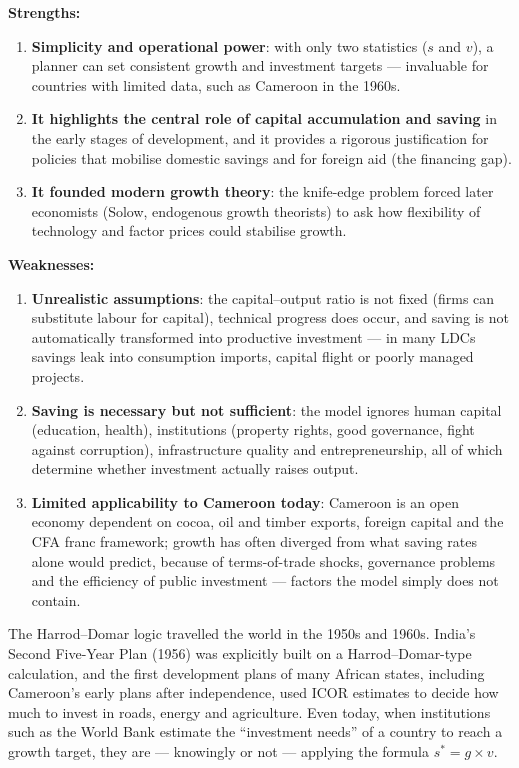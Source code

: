 \documentclass[11pt]{article}
\newcounter{popsec}
\newcounter{popsub}
\newcommand{\courssub}[1]{%
  \stepcounter{popsub}%
  \par\vspace{9pt}\noindent{\popxbold\fontsize{11.5}{13}\selectfont\color{popink}{\color{poporange}\thepopsec.\thepopsub}\hspace{6pt}#1}\par\nopagebreak\vspace{4pt}
}
\begin{document}
\courssub{Critical Evaluation of the Harrod--Domar Model}

\begin{propriete}
\textbf{Strengths:}
\begin{enumerate}
\item \textbf{Simplicity and operational power}: with only two statistics ($s$ and $v$), a planner can set consistent growth and investment targets — invaluable for countries with limited data, such as Cameroon in the 1960s.
\item \textbf{It highlights the central role of capital accumulation and saving} in the early stages of development, and it provides a rigorous justification for policies that mobilise domestic savings and for foreign aid (the financing gap).
\item \textbf{It founded modern growth theory}: the knife-edge problem forced later economists (Solow, endogenous growth theorists) to ask how flexibility of technology and factor prices could stabilise growth.
\end{enumerate}
\textbf{Weaknesses:}
\begin{enumerate}
\item \textbf{Unrealistic assumptions}: the capital--output ratio is not fixed (firms can substitute labour for capital), technical progress does occur, and saving is not automatically transformed into productive investment — in many LDCs savings leak into consumption imports, capital flight or poorly managed projects.
\item \textbf{Saving is necessary but not sufficient}: the model ignores human capital (education, health), institutions (property rights, good governance, fight against corruption), infrastructure quality and entrepreneurship, all of which determine whether investment actually raises output.
\item \textbf{Limited applicability to Cameroon today}: Cameroon is an open economy dependent on cocoa, oil and timber exports, foreign capital and the CFA franc framework; growth has often diverged from what saving rates alone would predict, because of terms-of-trade shocks, governance problems and the efficiency of public investment — factors the model simply does not contain.
\end{enumerate}
\end{propriete}

\begin{savaistu}
The Harrod--Domar logic travelled the world in the 1950s and 1960s. India's Second Five-Year Plan (1956) was explicitly built on a Harrod--Domar-type calculation, and the first development plans of many African states, including Cameroon's early plans after independence, used ICOR estimates to decide how much to invest in roads, energy and agriculture. Even today, when institutions such as the World Bank estimate the ``investment needs'' of a country to reach a growth target, they are — knowingly or not — applying the formula $s^* = g \times v$.
\end{savaistu}
\end{document}
